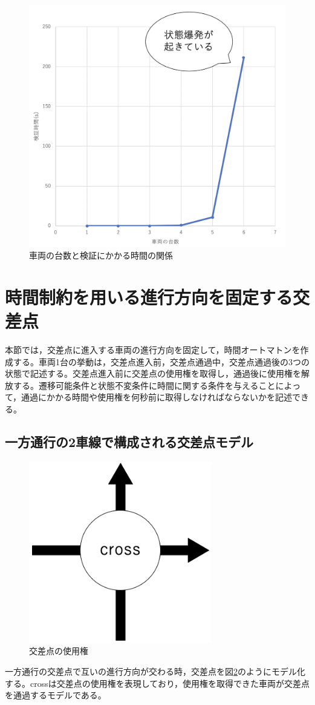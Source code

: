 \documentclass{tpu-sotu}
\begin{document}
	\begin{figure}[htbp]
	\centering
	\includegraphics[width=120mm]{IntersectionVerificationTime.png}
	\caption{車両の台数と検証にかかる時間の関係}
	\label{IVT}
	\end{figure}

	
	\section{時間制約を用いる進行方向を固定する交差点}
	本節では，交差点に進入する車両の進行方向を固定して，時間オートマトン\cite{u3}を作成する。車両1台の挙動は，交差点進入前，交差点通過中，交差点通過後の3つの状態で記述する。交差点進入前に交差点の使用権を取得し，通過後に使用権を解放する。遷移可能条件と状態不変条件に時間に関する条件を与えることによって，通過にかかる時間や使用権を何秒前に取得しなければならないかを記述できる。
	\subsection{一方通行の2車線で構成される交差点モデル}
	\begin{figure}[htbp]
	\centering
	\includegraphics[width=80mm]{SimplePerpendicular.png}
	\caption{交差点の使用権}
	\label{SimpleP}
	\end{figure}
	一方通行の交差点で互いの進行方向が交わる時，交差点を図\ref{SimpleP}のようにモデル化する。crossは交差点の使用権を表現しており，使用権を取得できた車両が交差点を通過するモデルである。
\end{document}
